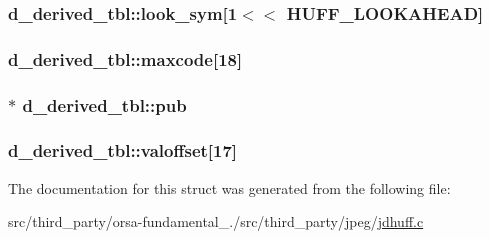 \subsubsection[{look\+\_\+sym}]{ d\+\_\+derived\+\_\+tbl\+::look\+\_\+sym\mbox{[}1$<$$<$ {\bf H\+U\+F\+F\+\_\+\+L\+O\+O\+K\+A\+H\+E\+A\+D}\mbox{]}}\label{structd__derived__tbl_a526051256461864bc8395d1f6d1a82fd}
\hypertarget{structd__derived__tbl_a4e226d20d913f1c516bd98a930008ad1}{}
\subsubsection[{maxcode}]{ d\+\_\+derived\+\_\+tbl\+::maxcode\mbox{[}18\mbox{]}}\label{structd__derived__tbl_a4e226d20d913f1c516bd98a930008ad1}
\hypertarget{structd__derived__tbl_a816f4c07d3173cd1a96ef146acabf6c6}{}
\subsubsection[{pub}]{$\ast$ d\+\_\+derived\+\_\+tbl\+::pub}\label{structd__derived__tbl_a816f4c07d3173cd1a96ef146acabf6c6}
\hypertarget{structd__derived__tbl_a67397b3869145321a25d2df17a0c11ec}{}
\subsubsection[{valoffset}]{ d\+\_\+derived\+\_\+tbl\+::valoffset\mbox{[}17\mbox{]}}\label{structd__derived__tbl_a67397b3869145321a25d2df17a0c11ec}


The documentation for this struct was generated from the following file\+:\begin{DoxyCompactItemize}
\item 
src/third\+\_\+party/orsa-\/fundamental\+\_./src/third\+\_\+party/jpeg/\hyperlink{jdhuff_8c}{jdhuff.\+c}\end{DoxyCompactItemize}
